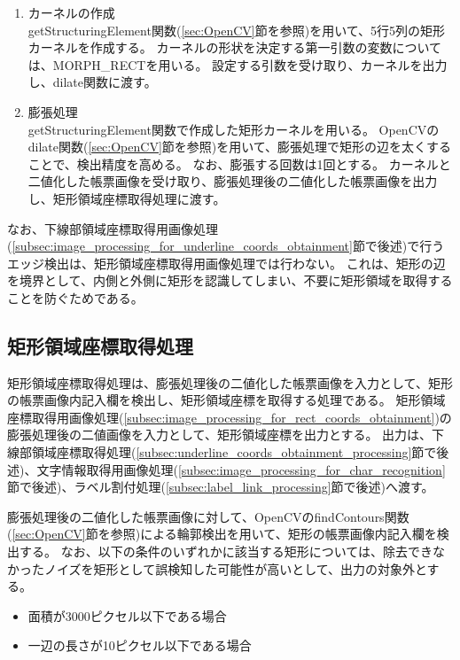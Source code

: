\begin{enumerate}
    \item カーネルの作成\\
        getStructuringElement関数(\ref{sec:OpenCV}節を参照)を用いて、5行5列の矩形カーネルを作成する。
        カーネルの形状を決定する第一引数の変数については、MORPH\_RECTを用いる。
        設定する引数を受け取り、カーネルを出力し、dilate関数に渡す。
    \item 膨張処理\\
        getStructuringElement関数で作成した矩形カーネルを用いる。
        OpenCVのdilate関数(\ref{sec:OpenCV}節を参照)を用いて、膨張処理で矩形の辺を太くすることで、検出精度を高める。
        なお、膨張する回数は1回とする。
        カーネルと二値化した帳票画像を受け取り、膨張処理後の二値化した帳票画像を出力し、矩形領域座標取得処理に渡す。
\end{enumerate}

なお、下線部領域座標取得用画像処理(\ref{subsec:image_processing_for_underline_coords_obtainment}節で後述)で行うエッジ検出は、矩形領域座標取得用画像処理では行わない。
これは、矩形の辺を境界として、内側と外側に矩形を認識してしまい、不要に矩形領域を取得することを防ぐためである。

\subsection{矩形領域座標取得処理}\label{subsec:rect_coords_obtainment_processing}
矩形領域座標取得処理は、膨張処理後の二値化した帳票画像を入力として、矩形の帳票画像内記入欄を検出し、矩形領域座標を取得する処理である。
矩形領域座標取得用画像処理(\ref{subsec:image_processing_for_rect_coords_obtainment})の膨張処理後の二値画像を入力として、矩形領域座標を出力とする。
出力は、下線部領域座標取得処理(\ref{subsec:underline_coords_obtainment_processing}節で後述)、文字情報取得用画像処理(\ref{subsec:image_processing_for_char_recognition}節で後述)、ラベル割付処理(\ref{subsec:label_link_processing}節で後述)へ渡す。

膨張処理後の二値化した帳票画像に対して、OpenCVのfindContours関数(\ref{sec:OpenCV}節を参照)による輪郭検出を用いて、矩形の帳票画像内記入欄を検出する。
なお、以下の条件のいずれかに該当する矩形については、除去できなかったノイズを矩形として誤検知した可能性が高いとして、出力の対象外とする。

\begin{itemize}
    \item 面積が3000ピクセル以下である場合
    \item 一辺の長さが10ピクセル以下である場合
\end{itemize}

